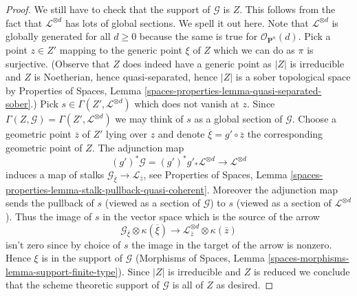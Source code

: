 \documentclass[10pt,a4paper]{amsart}
\theoremstyle{plain}
\theoremstyle{definition}
\theoremstyle{remark}
\numberwithin{equation}{subsection}
\begin{document}
\begin{proof}
\medskip\noindent
We still have to check that the support of $\mathcal{G}$ is $Z$.
This follows from the fact that $\mathcal{L}^{\otimes d}$ has
lots of global sections. We spell it out here.
Note that $\mathcal{L}^{\otimes d}$ is globally generated for all $d \geq 0$
because the same is true for $\mathcal{O}_{\mathbf{P}^n}(d)$.
Pick a point $z \in Z'$ mapping to the generic point $\xi$ of $Z$
which we can do as $\pi$ is surjective.
(Observe that $Z$ does indeed have a generic point as $|Z|$ is irreducible
and $Z$ is Noetherian, hence quasi-separated, hence $|Z|$ is a sober
topological space by
Properties of Spaces, Lemma
\ref{spaces-properties-lemma-quasi-separated-sober}.)
Pick $s \in \Gamma(Z', \mathcal{L}^{\otimes d})$ which does not vanish at $z$.
Since $\Gamma(Z, \mathcal{G}) = \Gamma(Z', \mathcal{L}^{\otimes d})$
we may think of $s$ as a global section of $\mathcal{G}$.
Choose a geometric point $\overline{z}$ of $Z'$ lying over $z$
and denote $\overline{\xi} = g' \circ \overline{z}$
the corresponding geometric point of $Z$. The adjunction map
$$
(g')^*\mathcal{G} =
(g')^*g'_*\mathcal{L}^{\otimes d} \longrightarrow \mathcal{L}^{\otimes d}
$$
induces a map of stalks
$\mathcal{G}_{\overline{\xi}} \to \mathcal{L}_{\overline{z}}$, see
Properties of Spaces, Lemma
\ref{spaces-properties-lemma-stalk-pullback-quasi-coherent}.
Moreover the adjunction map sends the pullback of $s$ (viewed as a section
of $\mathcal{G}$) to $s$ (viewed as a section of $\mathcal{L}^{\otimes d}$).
Thus the image of $s$ in the vector space which is the source of the arrow
$$
\mathcal{G}_{\overline{\xi}} \otimes \kappa(\overline{\xi})
\longrightarrow
\mathcal{L}^{\otimes d}_{\overline{z}} \otimes \kappa(\overline{z})
$$
isn't zero since by choice of $s$ the image in the target of the arrow
is nonzero. Hence $\xi$ is in the support of $\mathcal{G}$
(Morphisms of Spaces, Lemma \ref{spaces-morphisms-lemma-support-finite-type}).
Since $|Z|$ is irreducible and $Z$ is reduced we conclude that
the scheme theoretic support of $\mathcal{G}$ is all of $Z$ as desired.
\end{proof}
\end{document}
